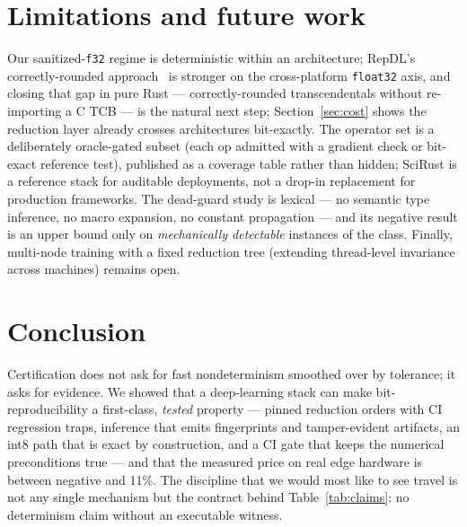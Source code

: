 \documentclass[sigconf,review]{acmart}
\begin{document}
\section{Limitations and future work}
\label{sec:limits}

Our sanitized-\texttt{f32} regime is deterministic within an architecture;
RepDL's correctly-rounded approach~\cite{xie2025repdl} is stronger on the
cross-platform \texttt{float32} axis, and closing that gap in pure Rust ---
correctly-rounded transcendentals without re-importing a C TCB --- is the
natural next step; Section~\ref{sec:cost} shows the reduction layer already
crosses architectures bit-exactly. The operator set is a deliberately
oracle-gated subset (each op admitted with a gradient check or bit-exact
reference test), published as a coverage table rather than hidden; SciRust
is a reference stack for auditable deployments, not a drop-in replacement
for production frameworks. The dead-guard study is lexical --- no semantic
type inference, no macro expansion, no constant propagation --- and its
negative result is an upper bound only on \emph{mechanically detectable}
instances of the class. Finally, multi-node training with a fixed reduction
tree (extending thread-level invariance across machines) remains open.

\section{Conclusion}

Certification does not ask for fast nondeterminism smoothed over by
tolerance; it asks for evidence. We showed that a deep-learning stack can
make bit-reproducibility a first-class, \emph{tested} property --- pinned
reduction orders with CI regression traps, inference that emits fingerprints
and tamper-evident artifacts, an int8 path that is exact by construction,
and a CI gate that keeps the numerical preconditions true --- and that the
measured price on real edge hardware is between negative and 11\%. The
discipline that we would most like to see travel is not any single
mechanism but the contract behind Table~\ref{tab:claims}: no determinism
claim without an executable witness.

\begin{acks}
\end{acks}



\end{document}
